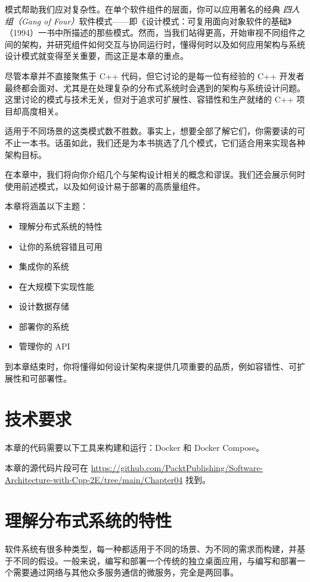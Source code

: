 模式帮助我们应对复杂性。在单个软件组件的层面，你可以应用著名的经典 \emph{四人组（Gang of Four）}软件模式——即《设计模式：可复用面向对象软件的基础》（1994）一书中所描述的那些模式。然而，当我们站得更高，开始审视不同组件之间的架构，并研究组件如何交互与协同运行时，懂得何时以及如何应用架构与系统设计模式就变得至关重要，而这正是本章的重点。

尽管本章并不直接聚焦于 C++ 代码，但它讨论的是每一位有经验的 C++ 开发者最终都会面对、尤其是在处理复杂的分布式系统时会遇到的架构与系统设计问题。这里讨论的模式与技术无关，但对于追求可扩展性、容错性和生产就绪的 C++ 项目却高度相关。

适用于不同场景的这类模式数不胜数。事实上，想要全部了解它们，你需要读的可不止一本书。话虽如此，我们还是为本书挑选了几个模式，它们适合用来实现各种架构目标。

在本章中，我们将向你介绍几个与架构设计相关的概念和谬误。我们还会展示何时使用前述模式，以及如何设计易于部署的高质量组件。

本章将涵盖以下主题：

\begin{itemize}
\item 理解分布式系统的特性
\item 让你的系统容错且可用
\item 集成你的系统
\item 在大规模下实现性能
\item 设计数据存储
\item 部署你的系统
\item 管理你的 API
\end{itemize}

到本章结束时，你将懂得如何设计架构来提供几项重要的品质，例如容错性、可扩展性和可部署性。

\section{技术要求}

本章的代码需要以下工具来构建和运行：Docker 和 Docker Compose。

本章的源代码片段可在 \href{https://github.com/PacktPublishing/Software-Architecture-with-Cpp-2E/tree/main/Chapter04}{https://github.com/PacktPublishing/Software-Architecture-with-Cpp-2E/tree/main/Chapter04} 找到。

\section{理解分布式系统的特性}

\label{idx:261}
软件系统有很多种类型，每一种都适用于不同的场景、为不同的需求而构建，并基于不同的假设。一般来说，编写和部署一个传统的独立桌面应用，与编写和部署一个需要通过网络与其他众多服务通信的微服务，完全是两回事。

